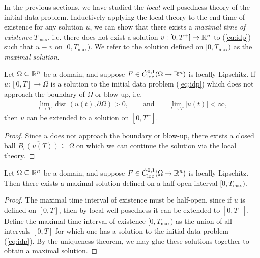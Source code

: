 In the previous sections, we have studied the \textit{local} well-posedness theory of the initial data problem. Inductively applying the local theory to the end-time of existence for any solution $u$, we can show that there exists a \emph{maximal time of existence} $T_{\text{max}}$, i.e. there does not exist a solution $v : [0, T^+] \to \mathbb R^n$ to (\ref{eq:idp}) such that $u \equiv v$ on $[0, T_{\text{max}})$. We refer to the solution defined on $[0, T_{\text{max}})$ as the \emph{maximal solution}. 

\begin{theorem}
	Let $\Omega \subseteq \mathbb R^n$ be a domain, and suppose $F \in \dot C^{0, 1}_{\mathrm{loc}} (\Omega \to \mathbb R^n)$ is locally Lipschitz. If $u : [0, T] \to \Omega$ is a solution to the initial data problem (\ref{eq:idp}) which does not approach the boundary of $\Omega$ or blow-up, i.e.
		\begin{align*}
			\lim_{t \to T}\operatorname{dist} (u(t), \partial \Omega) 
				> 0, \qquad \text{and} \qquad
			\lim_{t \to T} |u(t)| 
				< \infty,
		\end{align*}
	then $u$ can be extended to a solution on $[0, T^+]$. 
\end{theorem}

\begin{proof}
	Since $u$ does not approach the boundary or blow-up, there exists a closed ball $\overline{B_\epsilon(u(T))} \subseteq \Omega$ on which we can continue the solution via the local theory. 
\end{proof}

\begin{corollary}
	Let $\Omega \subseteq \mathbb R^n$ be a domain, and suppose $F \in \dot C^{0, 1}_{\mathrm{loc}} (\Omega \to \mathbb R^n)$ is locally Lipschitz. Then there exists a maximal solution defined on a half-open interval $[0, T_{\text{max}})$. 
\end{corollary}

\begin{proof}
	The maximal time interval of existence must be half-open, since if $u$ is defined on $[0, T]$, then by local well-posedness it can be extended to $[0, T^+]$. Define the maximal time interval of existence $[0, T_{\text{max}})$ as the union of all intervals $[0, T]$ for which one has a solution to the initial data problem (\ref{eq:idp}). By the uniqueness theorem, we may glue these solutions together to obtain a maximal solution.
\end{proof}

